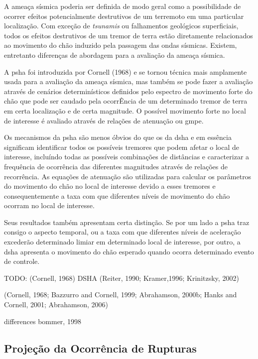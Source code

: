 A ameaça sísmica poderia ser definida de modo geral como a possibilidade de ocorrer efeitos potencialmente destrutivos
de um terremoto em uma particular localização. Com exceção de \textit{tsunamis} ou falhamentos geológicos superficiais,
todos os efeitos destrutivos de um tremor de terra estão diretamente relacionados ao movimento do chão induzido pela
passagem das ondas sísmicas. Existem, entretanto diferenças de abordagem para a avaliação da ameaça sísmica.

A \gls{psha} foi introduzida por Cornell (1968) e se tornou técnica mais amplamente usada para a avaliação da
ameaça sísmica, mas também se pode fazer a avaliação através de cenários determinísticos definidos pelo espectro de
movimento forte do chão que pode ser caudado pela ocorrÊncia de um determinado tremor de terra em certa localização e
de certa magnitude. O possível movimento forte no local de interesse é avaliado através de relações de atenuação ou
\gls{gmpe}.

Os mecanismos da \gls{psha} são menos óbvios do que os da \gls{dsha} e em essência significam identificar todos os
possíveis tremores que podem afetar o local de interesse, incluíndo todas as possíveis combinações de distâncias e
caracterizar a frequência de ocorrência das diferentes magnitudes através de relações de recorrência. As equações de
atenuação são utilizadas para calcular os parâmetros do movimento do chão no local de interesse devido a esses tremores
e consequentemente a taxa com que diferentes níveis de movimento do chão ocorram no local de interesse. 

Seus resultados também apresentam certa distinção. Se por um lado a \gls{psha} traz consigo o aspecto temporal, ou a
taxa com que diferentes níveis de aceleração excederão determinado limiar em determinado local de interesse,
por outro, a \gls{dsha} apresenta o movimento do chão esperado quando ocorra determinado evento de controle.

TODO:
(Cornell, 1968) 
DSHA  (Reiter, 1990; Kramer,1996; Krinitzsky, 2002)

(Cornell, 1968;  Bazzurro and Cornell, 1999; Abrahamson, 2000b; Hanks and Cornell, 2001; Abrahamson, 2006) 

differences bommer, 1998
 
\subsection{Projeção da Ocorrência de Rupturas}
\label{sec:projecao}

